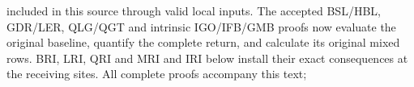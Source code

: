 included in this source through valid local inputs.
The accepted BSL/HBL, GDR/LER, QLG/QGT and intrinsic IGO/IFB/GMB
proofs now evaluate the original baseline, quantify the complete
return, and calculate its original mixed rows. BRI, LRI, QRI and
MRI and IRI below install their exact consequences at the receiving sites.
All complete proofs accompany this text;